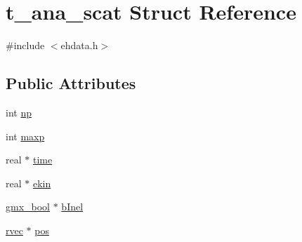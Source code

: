 \hypertarget{structt__ana__scat}{\section{t\-\_\-ana\-\_\-scat \-Struct \-Reference}
\label{structt__ana__scat}
}


{\ttfamily \#include $<$ehdata.\-h$>$}

\subsection*{\-Public \-Attributes}
\begin{DoxyCompactItemize}
\item 
int \hyperlink{structt__ana__scat_a3fdab3a61c8d70e9bc79ca2fa9c3c282}{np}
\item 
int \hyperlink{structt__ana__scat_aaf6a7530da89f4247d731333c3dd9be2}{maxp}
\item 
real $\ast$ \hyperlink{structt__ana__scat_a7795f189590246ad3aec951c3006d17d}{time}
\item 
real $\ast$ \hyperlink{structt__ana__scat_a4c0fd6da74c59464ee6269111b94d656}{ekin}
\item 
\hyperlink{include_2types_2simple_8h_a8fddad319f226e856400d190198d5151}{gmx\-\_\-bool} $\ast$ \hyperlink{structt__ana__scat_a86b752273516b34cbb6f48d3e86cfc8b}{b\-Inel}
\item 
\hyperlink{share_2template_2gromacs_2types_2simple_8h_aa02a552a4abd2f180c282a083dc3a999}{rvec} $\ast$ \hyperlink{structt__ana__scat_adccd594835225465d79de7306c3ff77c}{pos}
\end{DoxyCompactItemize}


